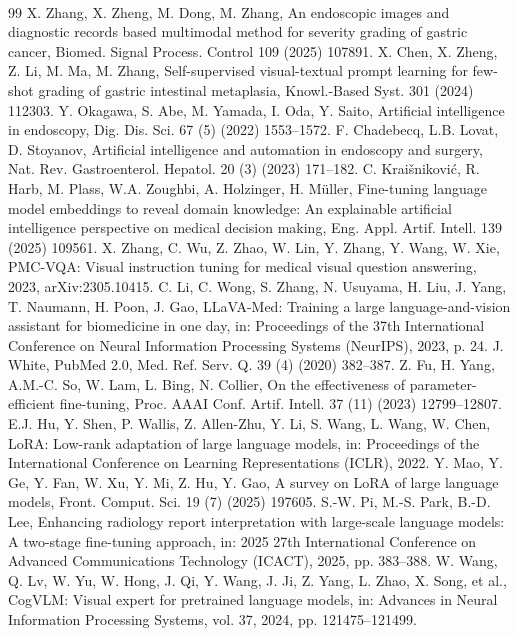 ﻿﻿\documentclass[12pt]{report}
\begin{document}
\begin{thebibliography}{99}
 X. Zhang, X. Zheng, M. Dong, M. Zhang, An endoscopic images and diagnostic records based multimodal method for severity grading of gastric cancer, Biomed. Signal Process. Control 109 (2025) 107891.
 X. Chen, X. Zheng, Z. Li, M. Ma, M. Zhang, Self-supervised visual-textual prompt learning for few-shot grading of gastric intestinal metaplasia, Knowl.-Based Syst. 301 (2024) 112303.
 Y. Okagawa, S. Abe, M. Yamada, I. Oda, Y. Saito, Artificial intelligence in endoscopy, Dig. Dis. Sci. 67 (5) (2022) 1553--1572.
 F. Chadebecq, L.B. Lovat, D. Stoyanov, Artificial intelligence and automation in endoscopy and surgery, Nat. Rev. Gastroenterol. Hepatol. 20 (3) (2023) 171--182.
 C. Krai\v{s}nikovi\'c, R. Harb, M. Plass, W.A. Zoughbi, A. Holzinger, H. M\"uller, Fine-tuning language model embeddings to reveal domain knowledge: An explainable artificial intelligence perspective on medical decision making, Eng. Appl. Artif. Intell. 139 (2025) 109561.
 X. Zhang, C. Wu, Z. Zhao, W. Lin, Y. Zhang, Y. Wang, W. Xie, PMC-VQA: Visual instruction tuning for medical visual question answering, 2023, arXiv:2305.10415.
 C. Li, C. Wong, S. Zhang, N. Usuyama, H. Liu, J. Yang, T. Naumann, H. Poon, J. Gao, LLaVA-Med: Training a large language-and-vision assistant for biomedicine in one day, in: Proceedings of the 37th International Conference on Neural Information Processing Systems (NeurIPS), 2023, p. 24.
 J. White, PubMed 2.0, Med. Ref. Serv. Q. 39 (4) (2020) 382--387.
 Z. Fu, H. Yang, A.M.-C. So, W. Lam, L. Bing, N. Collier, On the effectiveness of parameter-efficient fine-tuning, Proc. AAAI Conf. Artif. Intell. 37 (11) (2023) 12799--12807.
 E.J. Hu, Y. Shen, P. Wallis, Z. Allen-Zhu, Y. Li, S. Wang, L. Wang, W. Chen, LoRA: Low-rank adaptation of large language models, in: Proceedings of the International Conference on Learning Representations (ICLR), 2022.
 Y. Mao, Y. Ge, Y. Fan, W. Xu, Y. Mi, Z. Hu, Y. Gao, A survey on LoRA of large language models, Front. Comput. Sci. 19 (7) (2025) 197605.
 S.-W. Pi, M.-S. Park, B.-D. Lee, Enhancing radiology report interpretation with large-scale language models: A two-stage fine-tuning approach, in: 2025 27th International Conference on Advanced Communications Technology (ICACT), 2025, pp. 383--388.
 W. Wang, Q. Lv, W. Yu, W. Hong, J. Qi, Y. Wang, J. Ji, Z. Yang, L. Zhao, X. Song, et al., CogVLM: Visual expert for pretrained language models, in: Advances in Neural Information Processing Systems, vol. 37, 2024, pp. 121475--121499.

\end{thebibliography}
\end{document}
